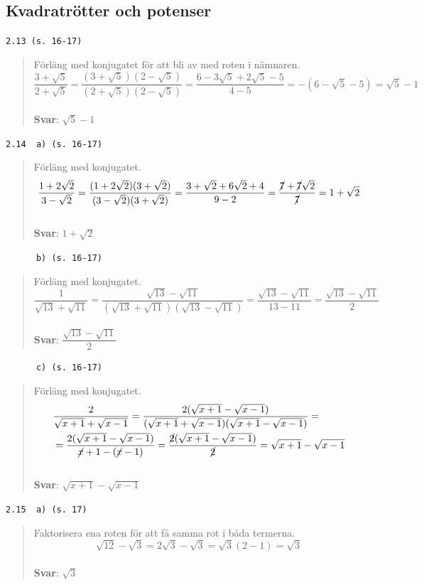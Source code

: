 \documentclass[a4paper]{article}
\newcommand{\tskcol}[1]{\textcolor{tskcol}{#1}}
\begin{document}
	\subsection*{Kvadratrötter och potenser}
	
	\texttt{\tskcol{2.13 (s. 16-17)}}
	\begin{quotation}
		\noindent
		Förläng med konjugatet för att bli av med roten i nämnaren.
		\[\dfrac{3+\sqrt{5}}{2+\sqrt{5}}=
		\dfrac{(3+\sqrt{5})(2-\sqrt{5})}{(2+\sqrt{5})(2-\sqrt{5})}=
		\dfrac{6-3\sqrt{5}+2\sqrt{5}-5}{4-5}=
		-(6-\sqrt{5}-5)=
		\sqrt{5}-1\]
		\\
		\textbf{Svar}: $\sqrt{5}-1$
	\end{quotation}
	
	\texttt{\tskcol{2.14~~a) (s. 16-17)}}
	\begin{quotation}
		\noindent
		Förläng med konjugatet.
		\[\dfrac{1+2\sqrt{2}}{3-\sqrt{2}}=
		\dfrac{(1+2\sqrt{2})(3+\sqrt{2})}{(3-\sqrt{2})(3+\sqrt{2})}=
		\dfrac{3+\sqrt{2}+6\sqrt{2}+4}{9-2}=
		\dfrac{\cancel{7}+\cancel{7}\sqrt{2}}{\cancel{7}}=
		1+\sqrt{2}\]
		\\
		\textbf{Svar}: $1+\sqrt{2}$
		
	\end{quotation}
	
	\pagebreak
	\texttt{\tskcol{~~~~~~b) (s. 16-17)}}
	\begin{quotation}
		\noindent
		Förläng med konjugatet.
		\[\dfrac{1}{\sqrt{13}+\sqrt{11}}=
		\dfrac{\sqrt{13}-\sqrt{11}}{(\sqrt{13}+\sqrt{11})(\sqrt{13}-\sqrt{11})}=
		\dfrac{\sqrt{13}-\sqrt{11}}{13-11}=
		\dfrac{\sqrt{13}-\sqrt{11}}{2}\]
		\\
		\textbf{Svar}: $\dfrac{\sqrt{13}-\sqrt{11}}{2}$
	\end{quotation}
	
	\texttt{\tskcol{~~~~~~c) (s. 16-17)}}
	\begin{quotation}
		\noindent
		Förläng med konjugatet.
		\begin{align*}
		&\dfrac{2}{\sqrt{x+1}+\sqrt{x-1}}=
		\dfrac{2(\sqrt{x+1}-\sqrt{x-1})}{(\sqrt{x+1}+\sqrt{x-1})(\sqrt{x+1}-\sqrt{x-1})}= \\
		&=\dfrac{2(\sqrt{x+1}-\sqrt{x-1})}{\cancel{x}+1-(\cancel{x}-1)}=
		\dfrac{\cancel{2}(\sqrt{x+1}-\sqrt{x-1})}{\cancel{2}}=
		\sqrt{x+1}-\sqrt{x-1}
		\end{align*}
		\\
		\textbf{Svar}: $\sqrt{x+1}-\sqrt{x-1}$
	\end{quotation}
	
	\texttt{\tskcol{2.15~~a) (s. 17)}}
	\begin{quotation}
		\noindent
		Faktorisera ena roten för att få samma rot i båda termerna.
		\[\sqrt{12}-\sqrt{3}=
		2\sqrt{3}-\sqrt{3}=
		\sqrt{3}(2-1)=
		\sqrt{3}\]
		\\
		\textbf{Svar}: $\sqrt{3}$
	\end{quotation}
	
\end{document}
